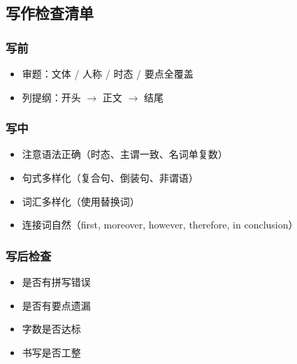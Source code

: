 \subsection{写作检查清单}

\subsubsection{写前}

\begin{itemize}
  \item 审题：文体 / 人称 / 时态 / 要点全覆盖
  \item 列提纲：开头 $\to$ 正文 $\to$ 结尾
\end{itemize}

\subsubsection{写中}

\begin{itemize}
  \item 注意语法正确（时态、主谓一致、名词单复数）
  \item 句式多样化（复合句、倒装句、非谓语）
  \item 词汇多样化（使用替换词）
  \item 连接词自然（first, moreover, however, therefore, in conclusion）
\end{itemize}

\subsubsection{写后检查}

\begin{itemize}
  \item 是否有拼写错误
  \item 是否有要点遗漏
  \item 字数是否达标
  \item 书写是否工整
\end{itemize}
